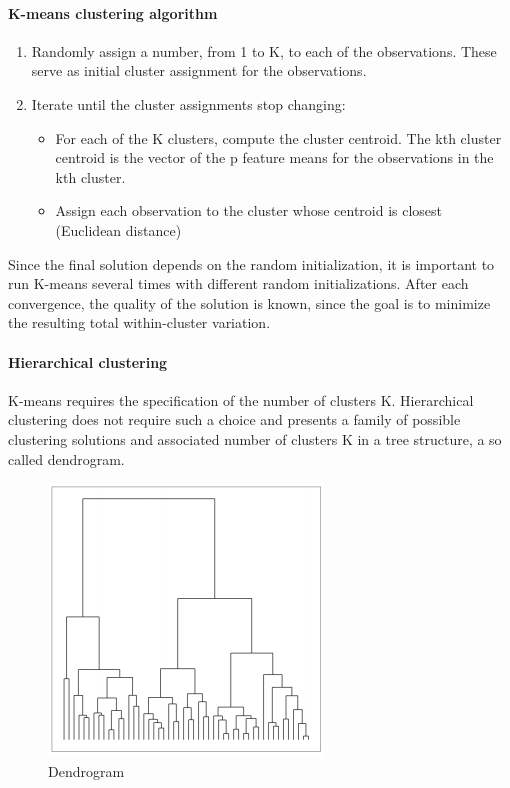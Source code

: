 \documentclass[../document.tex]{subfiles}
\begin{document}
	\paragraph{K-means clustering algorithm}
	\begin{enumerate}
		\item Randomly assign a number, from 1 to K, to each of the observations. These serve as initial cluster assignment for the observations.
		\item Iterate until the cluster assignments stop changing:
		\begin{itemize}
			\item For each of the K clusters, compute the cluster centroid. The kth cluster centroid is the vector of the p feature means for the observations in the kth cluster.
			\item Assign each observation to the cluster whose centroid is closest (Euclidean distance)
		\end{itemize}
	\end{enumerate}
	Since the final solution depends on the random initialization, it is important to run K-means several times with different random initializations. After each convergence, the quality of the solution is known, since the goal is to minimize the resulting total within-cluster variation.

	\paragraph{Hierarchical clustering}
	K-means requires the specification of the number of clusters K. Hierarchical clustering does not require such a choice and presents a family of possible clustering solutions and associated number of clusters K in a tree structure, a so called dendrogram.
	\begin{figure}
		\centering
		\includegraphics[width=0.7\linewidth]{pictures/dendrogram}
		\caption{Dendrogram}
		\label{fig:dendrogram}
	\end{figure}
\end{document}
